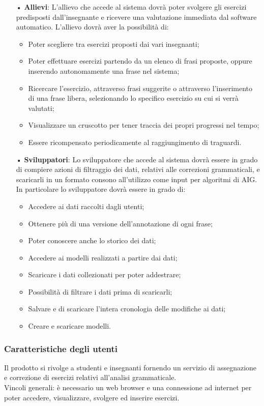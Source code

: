 \begin{itemize}
\item[•]\textbf{Allievi}:
L'allievo che accede al sistema dovrà poter svolgere gli esercizi predisposti dall'insegnante e ricevere una valutazione immediata dal software automatico.
L'allievo dovrà aver la possibilità di:
\begin{itemize}
\item Poter scegliere tra esercizi proposti dai vari insegnanti;
\item Poter effettuare esercizi partendo da un elenco di frasi proposte, oppure inserendo autonomamente una frase nel sistema;
\item Ricercare l'esercizio, attraverso frasi suggerite o attraverso l'inserimento di una frase libera, selezionando lo specifico esercizio su cui si verrà valutati; 
\item Visualizzare un {cruscotto} per tener traccia dei propri progressi nel tempo;
\item Essere ricompensato periodicamente al raggiungimento di traguardi.
\end{itemize}
\item[•]\textbf{Sviluppatori}:
Lo sviluppatore che accede al sistema dovrà essere in grado di compiere azioni di filtraggio dei dati, relativi alle correzioni grammaticali, e scaricarli in un formato consono all'utilizzo come input per algoritmi di {AIG}. 
In particolare lo sviluppatore dovrà essere in grado di:
\begin{itemize}
\item Accedere ai dati raccolti dagli utenti;
\item Ottenere più di una versione dell'annotazione di ogni frase;
\item Poter conoscere anche lo storico dei dati;
\item Accedere ai modelli realizzati a partire dai dati;
\item Scaricare i dati collezionati per poter addestrare;
\item Possibilità di filtrare i dati prima di scaricarli;
\item Salvare e di scaricare l'intera cronologia delle modifiche ai dati;
\item Creare e scaricare modelli.
\end{itemize}
\end{itemize}
\subsubsection{Caratteristiche degli utenti}
Il prodotto si rivolge a studenti e insegnanti fornendo un servizio di assegnazione e correzione di esercizi relativi all'analisi grammaticale. \\ 
Vincoli generali:
è necessario un web browser e una connessione ad internet per poter accedere, visualizzare, svolgere ed inserire esercizi.

